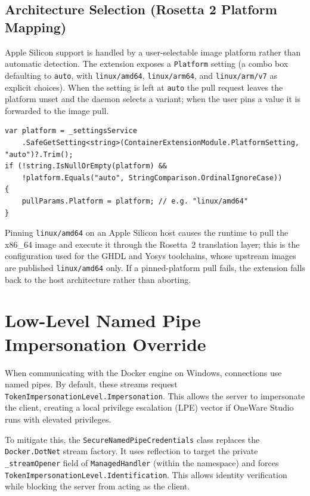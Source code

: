 \subsection{Architecture Selection (Rosetta 2 Platform Mapping)}
Apple Silicon support is handled by a user-selectable image platform rather than automatic detection. The extension exposes a \texttt{Platform} setting (a combo box defaulting to \texttt{auto}, with \texttt{linux/amd64}, \texttt{linux/arm64}, and \texttt{linux/arm/v7} as explicit choices). When the setting is left at \texttt{auto} the pull request leaves the platform unset and the daemon selects a variant; when the user pins a value it is forwarded to the image pull.
\begin{lstlisting}[language=CSharp, caption={Settings-driven platform resolution}, label={lst:arch}]
var platform = _settingsService
    .SafeGetSetting<string>(ContainerExtensionModule.PlatformSetting, "auto")?.Trim();
if (!string.IsNullOrEmpty(platform) &&
    !platform.Equals("auto", StringComparison.OrdinalIgnoreCase))
{
    pullParams.Platform = platform; // e.g. "linux/amd64"
}
\end{lstlisting}
Pinning \texttt{linux/amd64} on an Apple Silicon host causes the runtime to pull the x86\_64 image and execute it through the Rosetta~2 translation layer; this is the configuration used for the GHDL and Yosys toolchains, whose upstream images are published \texttt{linux/amd64} only. If a pinned-platform pull fails, the extension falls back to the host architecture rather than aborting.

\section{Low-Level Named Pipe Impersonation Override}
When communicating with the Docker engine on Windows, connections use named pipes. By default, these streams request \texttt{Token\-Impersonation\-Level.}\allowbreak\texttt{Impersonation}. This allows the server to impersonate the client, creating a local privilege escalation (LPE) vector if OneWare Studio runs with elevated privileges.

To mitigate this, the \texttt{Secure\-Named\-Pipe\-Credentials} class replaces the \texttt{Docker.\-Dot\-Net} stream factory. It uses reflection to target the private \texttt{\_stream\-Opener} field of \texttt{Managed\-Handler} (within the  namespace) and forces \texttt{Token\-Impersonation\-Level.}\allowbreak\texttt{Identification}. This allows identity verification while blocking the server from acting as the client.

